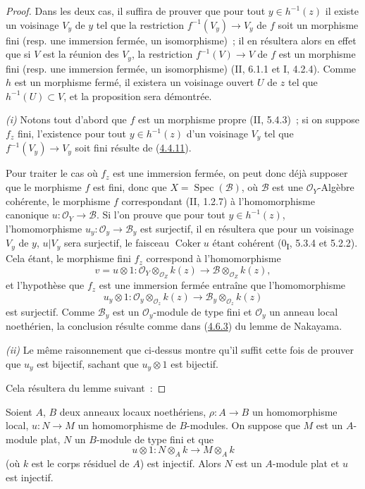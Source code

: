 \begin{proof}
Dans les deux cas, il suffira de prouver que pour tout $y\in h^{-1}(z)$ il
existe un voisinage $V_y$ de $y$ tel que la restriction
$f^{-1}(V_y)\to V_y$ de $f$ soit un morphisme fini (resp. une immersion
fermée, un isomorphisme)~; il en résultera alors en effet que si $V$ est la
réunion des $V_y$, la restriction $f^{-1}(V)\to V$ de $f$ est un morphisme
fini (resp. une immersion fermée, un isomorphisme) (II, 6.1.1 et I, 4.2.4).
Comme $h$ est un morphisme fermé, il existera un voisinage ouvert $U$ de $z$
tel que $h^{-1}(U)\subset V$, et la proposition sera démontrée.

\noindent\textit{(i)} Notons tout d'abord que $f$ est un morphisme propre
(II, 5.4.3)~; si on suppose $f_z$ fini, l'existence pour tout
$y\in h^{-1}(z)$ d'un voisinage $V_y$ tel que $f^{-1}(V_y)\to V_y$ soit fini
résulte de (\hyperref[III.4.4.11-fr]{4.4.11}).


Pour traiter le cas où $f_z$ est une immersion fermée, on peut donc déjà
supposer que le morphisme $f$ est fini, donc que
$X=\operatorname{Spec}(\mathcal B)$, où $\mathcal B$ est une
$\mathcal O_Y$-Algèbre cohérente, le morphisme $f$ correspondant (II, 1.2.7)
à l'homomorphisme canonique $u:\mathcal O_Y\to\mathcal B$. Si l'on prouve
que pour tout $y\in h^{-1}(z)$, l'homomorphisme
$u_y:\mathcal O_y\to\mathcal B_y$ est surjectif, il en résultera que pour un
voisinage $V_y$ de $y$, $u|V_y$ sera surjectif, le faisceau
$\operatorname{Coker}u$ étant cohérent (0\textsubscript{I}, 5.3.4 et 5.2.2).
Cela étant, le morphisme fini $f_z$ correspond à l'homomorphisme
\[
v=u\otimes1:
\mathcal O_Y\otimes_{\mathcal O_Z}k(z)
\longrightarrow
\mathcal B\otimes_{\mathcal O_Z}k(z),
\]
et l'hypothèse que $f_z$ est une immersion fermée entraîne que
l'homomorphisme
\[
u_y\otimes1:
\mathcal O_y\otimes_{\mathcal O_z}k(z)
\longrightarrow
\mathcal B_y\otimes_{\mathcal O_z}k(z)
\]
est surjectif. Comme $\mathcal B_y$ est un $\mathcal O_y$-module de type
fini et $\mathcal O_y$ un anneau local noethérien, la conclusion résulte
comme dans (\hyperref[III.4.6.3-fr]{4.6.3}) du lemme de Nakayama.

\noindent\textit{(ii)} Le même raisonnement que ci-dessus montre qu'il
suffit cette fois de prouver que $u_y$ est bijectif, sachant que
$u_y\otimes1$ est bijectif.

Cela résultera du lemme suivant~:
\end{proof}

\begin{lemma}[4.6.7.1]
\label{III.4.6.7.1-fr}
Soient $A$, $B$ deux anneaux locaux noethériens,
$\rho:A\to B$ un homomorphisme local, $u:N\to M$ un homomorphisme de
$B$-modules. On suppose que $M$ est un $A$-module plat, $N$ un $B$-module
de type fini et que
\[
u\otimes1:N\otimes_Ak\longrightarrow M\otimes_Ak
\]
(où $k$ est le corps résiduel de $A$) est injectif. Alors $N$ est un
$A$-module plat et $u$ est injectif.
\end{lemma}

